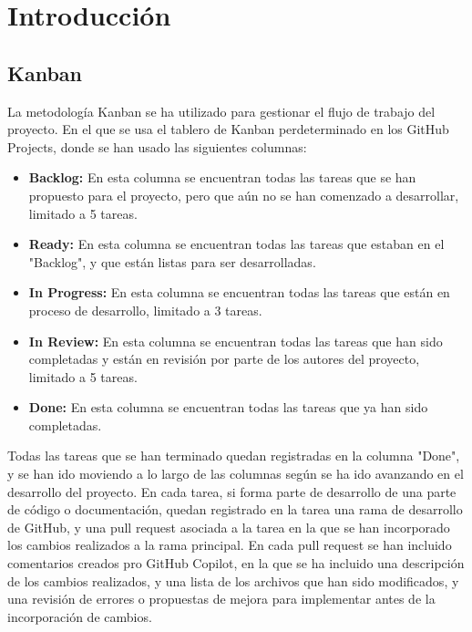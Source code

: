 
\section{Introducción}



\subsection{Kanban}
La metodología Kanban se ha utilizado para gestionar el flujo de trabajo del proyecto. En el que se usa el tablero de Kanban perdeterminado en los GitHub Projects, donde se han usado las siguientes columnas:
\begin{itemize}
    \item \textbf{Backlog:} En esta columna se encuentran todas las tareas que se han propuesto para el proyecto, pero que aún no se han comenzado a desarrollar, limitado a 5 tareas.
    \item \textbf{Ready:} En esta columna se encuentran todas las tareas que estaban en el "Backlog", y que están listas para ser desarrolladas.
    \item \textbf{In Progress:} En esta columna se encuentran todas las tareas que están en proceso de desarrollo, limitado a 3 tareas.
    \item \textbf{In Review:} En esta columna se encuentran todas las tareas que han sido completadas y están en revisión por parte de los autores del proyecto, limitado a 5 tareas.
    \item \textbf{Done:} En esta columna se encuentran todas las tareas que ya han sido completadas.
\end{itemize}

Todas las tareas que se han terminado quedan registradas en la columna "Done", y se han ido moviendo a lo largo de las columnas según se ha ido avanzando en el desarrollo del proyecto. En cada tarea, si forma parte de desarrollo de una parte de código o documentación, quedan registrado en la tarea una rama de desarrollo de GitHub, y una pull request asociada a la tarea en la que se han incorporado los cambios realizados a la rama principal. En cada pull request se han incluido comentarios creados pro GitHub Copilot, en la que se ha incluido una descripción de los cambios realizados, y una lista de los archivos que han sido modificados, y una revisión de errores o propuestas de mejora para implementar antes de la incorporación de cambios.

